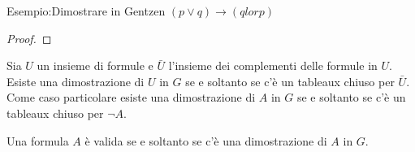 Esempio:Dimostrare in Gentzen $(p \lor q) \rightarrow (q lor p)$
\begin{proof}

\end{proof}
\begin{thm}
Sia $U$ un insieme di formule e $\bar{U}$ l'insieme dei complementi delle formule in $U$.
Esiste una dimostrazione di $U$ in $G$ se e soltanto se c'è un tableaux chiuso per $\bar{U}$.
Come caso particolare esiste una dimostrazione di $A$ in $G$ se e soltanto se c'è
un tableaux chiuso per $\neg A$.
\end{thm}


\begin{thm}
Una formula $A$ è valida se e soltanto se c'è una dimostrazione di $A$ in $G$.
\end{thm}


